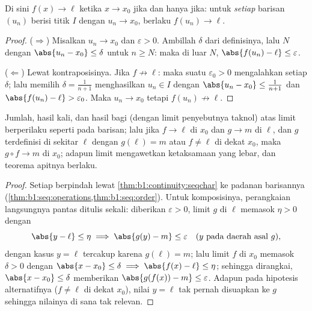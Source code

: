 \begin{theorem}\label{thm:b1:continuity:seqchar}
Di sini $f(x) \to \ell$ ketika $x \to x_0$ jika dan hanya jika: untuk \emph{setiap}
barisan $(u_n)$ berisi titik $I$ dengan $u_n \to x_0$, berlaku
$f(u_n) \to \ell$.
\end{theorem}

\begin{proof}
($\Rightarrow$) Misalkan $u_n \to x_0$ dan $\varepsilon > 0$. Ambillah
$\delta$ dari definisinya, lalu $N$ dengan $\abs{u_n - x_0} \leq
\delta$ untuk $n \geq N$: maka di luar $N$, $\abs{f(u_n) - \ell} \leq
\varepsilon$.

($\Leftarrow$) Lewat kontraposisinya. Jika $f \not\to \ell$: maka suatu
$\varepsilon_0 > 0$ mengalahkan setiap $\delta$; lalu memilih $\delta =
\frac{1}{n+1}$ menghasilkan $u_n \in I$ dengan $\abs{u_n - x_0} \leq
\frac{1}{n+1}$ dan $\abs{f(u_n) - \ell} > \varepsilon_0$. Maka $u_n
\to x_0$ tetapi $f(u_n) \not\to \ell$.
\end{proof}

\begin{corollary}\label{cor:b1:continuity:operations}
Jumlah, hasil kali, dan hasil bagi (dengan limit penyebutnya taknol) atas limit berperilaku
seperti pada barisan; lalu jika $f \to \ell$ di $x_0$ dan $g \to m$ di $\ell$,
dan $g$ terdefinisi di sekitar $\ell$ dengan $g(\ell) = m$ atau $f \neq \ell$
di dekat $x_0$, maka $g \circ f \to m$ di $x_0$; adapun limit mengawetkan
ketaksamaan yang lebar, dan teorema apitnya berlaku.
\end{corollary}

\begin{proof}
Setiap  berpindah lewat
\cref{thm:b1:continuity:seqchar} ke padanan barisannya
(\cref{thm:b1:seq:operations,thm:b1:seq:order}). Untuk komposisinya,
perangkaian langsungnya pantas ditulis sekali: diberikan $\varepsilon >
0$, limit $g$ di $\ell$ memasok $\eta > 0$ dengan
\[
\abs{y - \ell} \leq \eta \implies \abs{g(y) - m} \leq
\varepsilon \quad (y \text{ pada daerah asal } g),
\]
dengan kasus $y = \ell$ tercakup karena $g(\ell) = m$; lalu
limit $f$ di $x_0$ memasok $\delta > 0$ dengan $\abs{x -
x_0} \leq \delta \implies \abs{f(x) - \ell} \leq \eta$; sehingga dirangkai,
$\abs{x - x_0} \leq \delta$ memberikan $\abs{g(f(x)) - m} \leq
\varepsilon$. Adapun pada hipotesis alternatifnya ($f \neq \ell$ di dekat
$x_0$), nilai $y = \ell$ tak pernah disuapkan ke $g$ sehingga nilainya
di sana tak relevan.
\end{proof}

